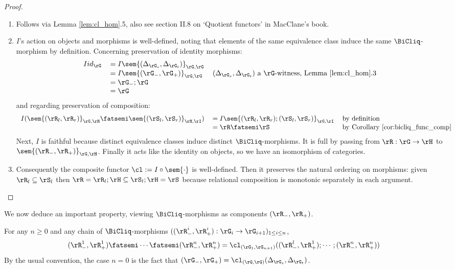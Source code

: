 \documentclass{article}
\begin{document}
\begin{proof}
\item
\begin{enumerate}
\item
Follows via Lemma \ref{lem:cl_hom}.5, also see section II.8 on `Quotient functors' in MacClane's book.

\item
$I$'s action on objects and morphisms is well-defined, noting that elements of the same equivalence class induce the same $\BiCliq$-morphism by definition. Concerning preservation of identity morphisms:
\[
\begin{tabular}{lll}
$I id_\rG$
&
$= I \sem{(\Delta_{\rG_s},\Delta_{\rG_t})}_{\rG,\rG}$
\\&
$= I \sem{(\rG_-,\rG_+)}_{\rG,\rG}$
& $(\Delta_{\rG_s},\Delta_{\rG_t})$ a $\rG$-witness, Lemma \ref{lem:cl_hom}.3
\\&
$= \rG_- ; \rG$
\\&
$= \rG$
\end{tabular}
\]
and regarding preservation of composition:
\[
\begin{tabular}{lll}
$I (\sem{(\rR_l,\rR_r)}_{\rG,\rH} \fatsemi \sem{(\rS_l,\rS_r)}_{\rH,\rI})$
&
$= I \sem{(\rR_l,\rR_r) ; (\rS_l,\rS_r)}_{\rG,\rI}$
& by definition
\\&
$= \rR \fatsemi \rS$
& by Corollary \ref{cor:bicliq_func_comp}
\end{tabular}
\]
Next, $I$ is faithful because distinct equivalence classes induce distinct $\BiCliq$-morphisms. It is full by passing from $\rR : \rG \to \rH$ to $\sem{(\rR_-,\rR_+)}_{\rG,\rH}$. Finally it acts like the identity on objects, so we have an isomorphism of categories.

\item
Consequently the composite functor $\cl := I \circ \sem{\cdot}$ is well-defined. Then it preserves the natural ordering on morphisms: given $\rR_l \subseteq \rS_l$ then $\rR = \rR_l ; \rH \subseteq \rS_l ; \rH = \rS$ because relational composition is monotonic separately in each argument.
\end{enumerate}
\end{proof}

We now deduce an important property, viewing $\BiCliq$-morphisms as components $(\rR_-,\rR_+)$.

\begin{corollary}
For any $n \geq 0$ and any chain of $\BiCliq$-morphisms $((\rR_-^i,\rR_+^i) : \rG_i \to \rG_{i+1})_{1 \leq i \leq n}$,
\[
(\rR_-^1,\rR_+^1) \fatsemi \cdots \fatsemi (\rR_-^n,\rR_+^n)
= \cl_{(\rG_1,\rG_{n+1})}((\rR^l_-,\rR^1_+);\cdots;(\rR^n_-,\rR^n_+))
\]
By the usual convention, the case $n = 0$ is the fact that $(\rG_-,\rG_+) = \cl_{(\rG,\rG)}(\Delta_{\rG_s},\Delta_{\rG_t})$.
\end{corollary}
\end{document}
